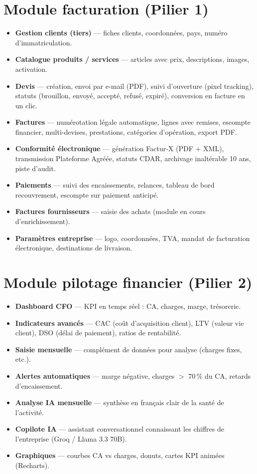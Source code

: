 \documentclass[11pt,a4paper]{report}
\newcommand{\feat}[1]{\textbf{#1}}
\begin{document}
\section{Module facturation (Pilier 1)}

\begin{itemize}[leftmargin=*]
    \item \feat{Gestion clients (tiers)} — fiches clients, coordonnées, pays, numéro d'immatriculation.
    \item \feat{Catalogue produits / services} — articles avec prix, descriptions, images, activation.
    \item \feat{Devis} — création, envoi par e-mail (PDF), suivi d'ouverture (pixel tracking),
    statuts (brouillon, envoyé, accepté, refusé, expiré), conversion en facture en un clic.
    \item \feat{Factures} — numérotation légale automatique, lignes avec remises, escompte financier,
    multi-devises, prestations, catégories d'opération, export PDF.
    \item \feat{Conformité électronique} — génération Factur-X (PDF + XML), transmission Plateforme Agréée,
    statuts CDAR, archivage inaltérable 10 ans, piste d'audit.
    \item \feat{Paiements} — suivi des encaissements, relances, tableau de bord recouvrement,
    escompte sur paiement anticipé.
    \item \feat{Factures fournisseurs} — saisie des achats (module en cours d'enrichissement).
    \item \feat{Paramètres entreprise} — logo, coordonnées, TVA, mandat de facturation électronique,
    destinations de livraison.
\end{itemize}

\section{Module pilotage financier (Pilier 2)}

\begin{itemize}[leftmargin=*]
    \item \feat{Dashboard CFO} — KPI en temps réel : CA, charges, marge, trésorerie.
    \item \feat{Indicateurs avancés} — CAC (coût d'acquisition client), LTV (valeur vie client),
    DSO (délai de paiement), ratios de rentabilité.
    \item \feat{Saisie mensuelle} — complément de données pour analyse (charges fixes, etc.).
    \item \feat{Alertes automatiques} — marge négative, charges $>$ 70\,\% du CA, retards d'encaissement.
    \item \feat{Analyse IA mensuelle} — synthèse en français clair de la santé de l'activité.
    \item \feat{Copilote IA} — assistant conversationnel connaissant les chiffres de l'entreprise
    (Groq / Llama 3.3 70B).
    \item \feat{Graphiques} — courbes CA vs charges, donuts, cartes KPI animées (Recharts).
\end{itemize}
\end{document}

